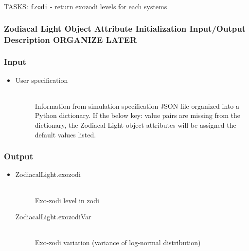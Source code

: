 \documentclass[cleanfoot]{asme2ej}
\begin{document}
TASKS: \verb+fzodi+ - return exozodi levels for each systems

\label{sec:zodiacallight}
\subsubsection{Zodiacal Light Object Attribute Initialization Input/Output Description ORGANIZE LATER}
\subsubsection*{Input}
\begin{itemize}
    \item
    \begin{description}
        \item[User specification] \hfill \\
        Information from simulation specification JSON file organized into a Python dictionary. If the below key: value pairs are missing from the dictionary, the Zodiacal Light object attributes will be assigned the default values listed.
    \end{description}
\end{itemize}

\subsubsection*{Output}
\begin{itemize}
    \item 
    \begin{description}
        \item[ZodiacalLight.exozodi] \hfill \\
        Exo-zodi level in zodi
        \item[ZodiacalLight.exozodiVar] \hfill \\
        Exo-zodi variation (variance of log-normal distribution)
    \end{description}
\end{itemize}
\end{document}
